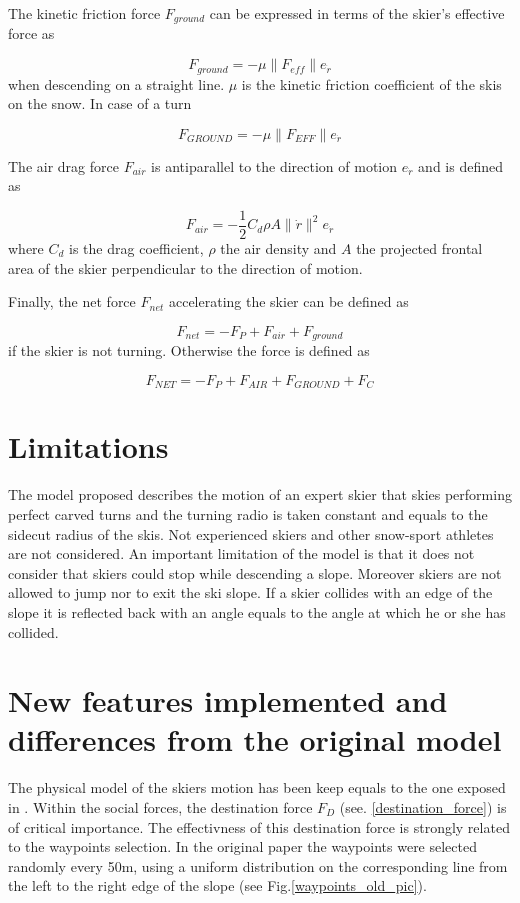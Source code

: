 \documentclass[12pt,a4paper,twoside]{book}
\newcommand{\norm}[1]{\lVert#1\rVert}
\begin{document}
The kinetic friction force $F_{ground}$ can be expressed in terms of the skier's effective force as

\begin{equation}
F_{ground}=-\mu \norm{F_{eff}}e_{\dot{r}}
\end{equation}
when descending on a straight line. $\mu$ is the kinetic friction coefficient of the skis on the snow. In case of a turn

\begin{equation}
F_{GROUND}=-\mu \norm{F_{EFF}}e_{\dot{r}}
\end{equation}

The air drag force $F_{air}$ is antiparallel to the direction of motion $e_{\dot{r}}$ and is defined as

\begin{equation}
F_{air}=-\frac{1}{2}C_d \rho A \norm{\dot{r}}^2 e_{\dot{r}}
\end{equation}
where $C_d$ is the drag coefficient, $\rho$ the air density and $A$ the projected frontal area of the skier perpendicular to the direction of motion.

Finally, the net force $F_{net}$ accelerating the skier can be defined as

\begin{equation}
F_{net}=-F_P + F_{air} + F_{ground}
\end{equation}
if the skier is not turning. Otherwise the force is defined as

\begin{equation}
F_{NET}=-F_P + F_{AIR} + F_{GROUND} + F_C
\end{equation}

\section{Limitations}
The model proposed describes the motion of an expert skier that skies performing perfect carved turns and the turning radio is taken constant and equals to the sidecut radius of the skis. Not experienced skiers and other snow-sport athletes are not considered. An important limitation of the model is that it does not consider that skiers could stop while descending a slope.  Moreover skiers are not allowed to jump nor to exit the ski slope. If a skier collides with an edge of the slope it is reflected back with an angle equals to the angle at which he or she has collided.

\section{New features implemented and differences from the original model}
The physical model of the skiers motion has been keep equals to the one exposed in \cite{hol2012}. Within the social forces, the destination force $F_D$ (see. \ref{destination_force}) is of critical importance. The effectivness of this destination force is strongly related to the waypoints selection. In the original paper the waypoints were selected randomly every 50m, using a uniform distribution on the corresponding line from the left to the right edge of the slope (see Fig.\ref{waypoints_old_pic}).
\end{document}
